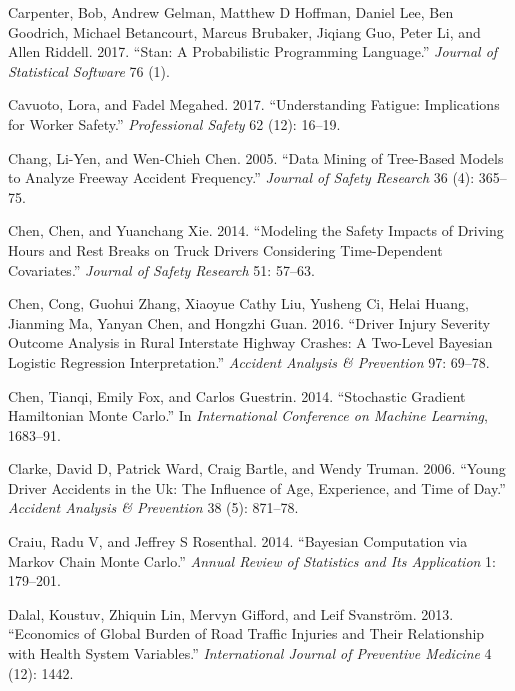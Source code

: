 \documentclass[12pt]{book}
\numberwithin{equation}{chapter}
\begin{document}
\leavevmode\hypertarget{ref-carpenter2017stan}{}%
Carpenter, Bob, Andrew Gelman, Matthew D Hoffman, Daniel Lee, Ben Goodrich, Michael Betancourt, Marcus Brubaker, Jiqiang Guo, Peter Li, and Allen Riddell. 2017. ``Stan: A Probabilistic Programming Language.'' \emph{Journal of Statistical Software} 76 (1).

\leavevmode\hypertarget{ref-cavuoto2017understanding}{}%
Cavuoto, Lora, and Fadel Megahed. 2017. ``Understanding Fatigue: Implications for Worker Safety.'' \emph{Professional Safety} 62 (12): 16--19.

\leavevmode\hypertarget{ref-chang2005data}{}%
Chang, Li-Yen, and Wen-Chieh Chen. 2005. ``Data Mining of Tree-Based Models to Analyze Freeway Accident Frequency.'' \emph{Journal of Safety Research} 36 (4): 365--75.

\leavevmode\hypertarget{ref-chen2014modeling}{}%
Chen, Chen, and Yuanchang Xie. 2014. ``Modeling the Safety Impacts of Driving Hours and Rest Breaks on Truck Drivers Considering Time-Dependent Covariates.'' \emph{Journal of Safety Research} 51: 57--63.

\leavevmode\hypertarget{ref-chen2016driver}{}%
Chen, Cong, Guohui Zhang, Xiaoyue Cathy Liu, Yusheng Ci, Helai Huang, Jianming Ma, Yanyan Chen, and Hongzhi Guan. 2016. ``Driver Injury Severity Outcome Analysis in Rural Interstate Highway Crashes: A Two-Level Bayesian Logistic Regression Interpretation.'' \emph{Accident Analysis \& Prevention} 97: 69--78.

\leavevmode\hypertarget{ref-chen2014stochastic}{}%
Chen, Tianqi, Emily Fox, and Carlos Guestrin. 2014. ``Stochastic Gradient Hamiltonian Monte Carlo.'' In \emph{International Conference on Machine Learning}, 1683--91.

\leavevmode\hypertarget{ref-clarke2006young}{}%
Clarke, David D, Patrick Ward, Craig Bartle, and Wendy Truman. 2006. ``Young Driver Accidents in the Uk: The Influence of Age, Experience, and Time of Day.'' \emph{Accident Analysis \& Prevention} 38 (5): 871--78.

\leavevmode\hypertarget{ref-craiu2014bayesian}{}%
Craiu, Radu V, and Jeffrey S Rosenthal. 2014. ``Bayesian Computation via Markov Chain Monte Carlo.'' \emph{Annual Review of Statistics and Its Application} 1: 179--201.

\leavevmode\hypertarget{ref-dalal2013economics}{}%
Dalal, Koustuv, Zhiquin Lin, Mervyn Gifford, and Leif Svanström. 2013. ``Economics of Global Burden of Road Traffic Injuries and Their Relationship with Health System Variables.'' \emph{International Journal of Preventive Medicine} 4 (12): 1442.
\end{document}
